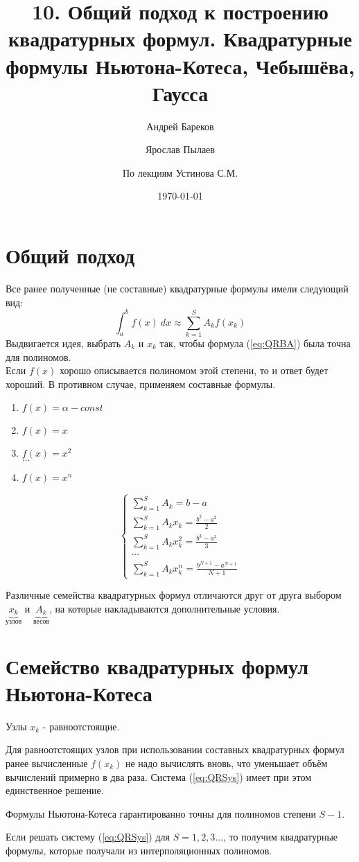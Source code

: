 \documentclass[a4paper,11pt]{article}
\title{10. Общий подход к построению квадратурных формул. Квадратурные формулы Ньютона-Котеса, Чебышёва, Гаусса}
\author{Андрей Бареков \and Ярослав Пылаев \and По лекциям Устинова С.М.}
\date{\today}
\begin{document}
\maketitle
\newpage

\section{Общий подход}
Все ранее полученные (не составные) квадратурные формулы имели следующий вид:
\begin{equation}
  \int_a^b f(x)\ dx \approx \sum_{k=1}^S A_k f(x_k)
  \label{eq:QRBA}
\end{equation}
Выдвигается идея, выбрать $A_k$ и $x_k$ так, чтобы формула (\ref{eq:QRBA}) была точна для полиномов. \\
Если $f(x)$ хорошо описывается полиномом этой степени, то и ответ будет хороший. В противном случае, применяем составные формулы.
\begin{enumerate}
  \item $f(x) = \alpha - const$
  \item $f(x) = x$
  \item $f(x) = x^2$ \\
        $\dots$
  \item $f(x) = x^n$
\end{enumerate}
\begin{importantblock}
  \begin{equation}
    \begin{cases}
      \sum_{k=1}^S A_k = b - a \\
      \sum_{k=1}^S A_k x_k = \frac{b^2-a^2}{2} \\
      \sum_{k=1}^S A_k x_k^2 = \frac{b^3-a^3}{3} \\
      \cdots \\
      \sum_{k=1}^S A_k x_k^n = \frac{b^{N+1}-a^{N+1}}{N+1}
      \end{cases}
    \label{eq:QRSys}
  \end{equation}
\end{importantblock}
Различные семейства квадратурных формул отличаются друг от друга выбором $\underbrace{x_k}_{\text{узлов}}$ и $\underbrace{A_k}_{\text{весов}}$, на которые
  накладываются дополнительные условия.

\section{Семейство квадратурных формул Ньютона-Котеса}
\begin{importantblock}
  Узлы $x_k$ - равноотстоящие.
\end{importantblock}
Для равноотстоящих узлов при использовании составных квадратурных формул ранее вычисленные $f(x_k)$ не надо вычислять вновь, что уменьшает объём вычислений
  примерно в два раза. Система (\ref{eq:QRSys}) имеет при этом единственное решение.
\begin{importantblock}
  Формулы Ньютона-Котеса гарантированно точны для полиномов степени $S-1$.
\end{importantblock}
Если решать систему (\ref{eq:QRSys}) для $S = 1, 2, 3\dots$, то получим квадратурные формулы, которые получали из интерполяционных полиномов.
\end{document}
